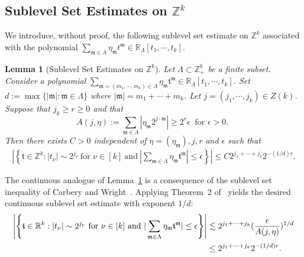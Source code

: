 \documentclass[11 pt,letterpaper]{amsart}
\theoremstyle{plain}
\newtheorem{lemma}{Lemma}\numberwithin{lemma}{section}
\theoremstyle{definition}
\theoremstyle{remark} \theoremstyle{exam} \theoremstyle{ob}
\numberwithin{equation}{section}
\begin{document}
 

	

 
 
 
 
 
 
 
 
 
 
 
 
 
  



 

\subsection{Sublevel Set Estimates on $\mathbb{Z}^k$}
We introduce, without proof, the following sublevel set estimate on $\mathbb{Z}^k$ associated with the polynomial
$
\sum_{\mathfrak{m}\in\Lambda}\eta_{\mathfrak{m}}t^{\mathfrak{m}}\in \mathbb{R}_{\Lambda}[t_1,\cdots,t_k].
$

\begin{lemma}[Sublevel Set Estimates on $\mathbb{Z}^k$]\label{eep1}
	Let $\Lambda\subset \mathbb{Z}^k_+$ be a finite subset. Consider a polynomial $\sum_{\mathfrak{m}=(m_1,\cdots,m_k)\in \Lambda}\eta_\mathfrak{m}\mathfrak{t}^\mathfrak{m}\in \mathbb{R}_{\Lambda}[t_1,\cdots,t_k]$. Set $
	d:=\max\{|\mathfrak{m}|:\mathfrak{m}\in \Lambda\}$ where $|\mathfrak{m}|=m_1+\cdots+m_k$.
	Let   $j=(j_1,\cdots,j_k)\in Z(k)$.  Suppose    that $ j_k \ge r\ge 0$ and that $$A(j,\eta):=\sum_{\mathfrak{m}\in \Lambda}|\eta_\mathfrak{m}2^{j\cdot \mathfrak{m}} |\ge 2^r\epsilon\ \text{ for $\epsilon>0$. }$$ Then there exists $ C >0$  independent of $\eta=(\eta_{\mathfrak{m}}),j,r$ and $\epsilon$  such that
	\begin{align*}
		\left|\left\{\mathfrak{t}\in \mathbb{Z}^k:|t_\nu|\sim 2^{j_\nu}\ \text{for $\nu\in [k]$}\ \text{and}\  |\sum_{\mathfrak{m}\in \Lambda}\eta_{\mathfrak{m}}\mathfrak{t}^\mathfrak{m}|\le \epsilon\right\} \right|\le C  2^{j_1+\cdots+j_k} 2^{-(1/d)r}.
	\end{align*}
\end{lemma}

The continuous analogue of Lemma~\ref{eep1} is a  consequence of
the sublevel set inequality of Carbery and Wright~\cite{CW}.
Applying Theorem~2 of~\cite{CW} yields the desired continuous sublevel set
estimate with exponent $1/d$: \begin{align*}
	\left|\left\{\mathfrak{t}\in \mathbb{R}^k:|t_\nu|\sim 2^{j_\nu}\ \text{for $\nu\in [k]$}\ \text{and}\  |\sum_{\mathfrak{m}\in \Lambda}\eta_{\mathfrak{m}}\mathfrak{t}^\mathfrak{m}|\le \epsilon\right\} \right|&\lesssim 2^{j_1+\cdots+j_k}(\frac{\epsilon}{A(j,\eta)})^{1/d}\\
	&\le   2^{j_1+\cdots+j_k} 2^{-(1/d)r}.\notag
\end{align*}
 
\end{document}
